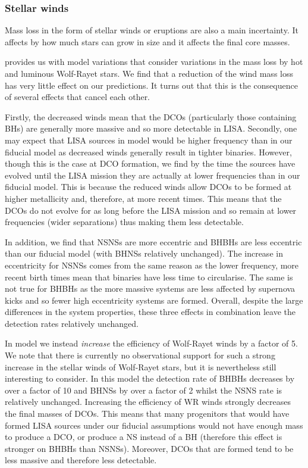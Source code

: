 \subsubsection{Stellar winds}
Mass loss in the form of stellar winds or eruptions are also a main incertainty. It affects by how much stars can grow in size and it affects the final core masses. 

\citet{Broekgaarden+2021} provides us with model variations that consider variations in the mass loss by hot and luminous Wolf-Rayet stars.   We find that a reduction of the wind mass loss  has very little effect on our predictions.  It turns out that this is the consequence of several effects that cancel each other. 

Firstly, the decreased winds mean that the DCOs (particularly those containing BHs) are generally more massive and so more detectable in LISA. Secondly, one may expect that LISA sources in model \modWRLow{} would be higher frequency than in our fiducial model as decreased winds generally result in tighter binaries. However, though this is the case at DCO formation, we find by the time the sources have evolved until the LISA mission they are actually at lower frequencies than in our fiducial model. This is because the reduced winds allow DCOs to be formed at higher metallicity and, therefore, at more recent times. This means that the DCOs do not evolve for as long before the LISA mission and so remain at lower frequencies (wider separations) thus making them less detectable. 

In addition, we find that NSNSs are more eccentric and BHBHs are less eccentric than our fiducial model (with BHNSs relatively unchanged). The increase in eccentricity for NSNSs comes from the same reason as the lower frequency, more recent birth times mean that binaries have less time to circularise. The same is not true for BHBHs as the more massive systems are less affected by supernova kicks and so fewer high eccentricity systems are formed. Overall, despite the large differences in the system properties, these three effects in combination leave the detection rates relatively unchanged.

In model \modWRHigh{} we instead \textit{increase} the efficiency of Wolf-Rayet winds by a factor of 5. We note that there is currently no observational support for such a strong increase in the stellar winds of Wolf-Rayet stars, but it is nevertheless still interesting to consider.  In this model the detection rate of BHBHs decreases by over a factor of 10 and BHNSs by over a factor of 2 whilst the NSNS rate is relatively unchanged. Increasing the efficiency of WR winds strongly decreases the final masses of DCOs. This means that many progenitors that would have formed LISA sources under our fiducial assumptions would not have enough mass to produce a DCO, or produce a NS instead of a BH (therefore this effect is stronger on BHBHs than NSNSs). Moreover, DCOs that are formed tend to be less massive and therefore less detectable. 

